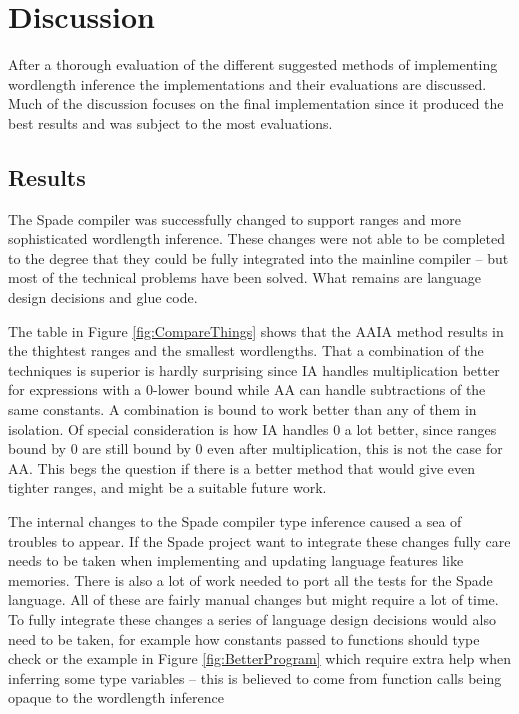 \chapter{Discussion}
\label{cha:Discussion}
After a thorough evaluation of the different suggested methods of implementing wordlength inference the implementations and their evaluations are discussed. Much of the discussion focuses on the final implementation since it produced the best results and was subject to the most evaluations.

\section{Results}
The Spade compiler was successfully changed to support ranges and more sophisticated wordlength inference. These changes were not able to be completed to the degree that they could be fully integrated into the mainline compiler -- but most of the technical problems have been solved. What remains are language design decisions and glue code.

The table in Figure \ref{fig:CompareThings} shows that the AAIA method results in the thightest ranges and the smallest wordlengths. That a combination of the techniques is superior is hardly surprising since IA handles multiplication better for expressions with a 0-lower bound while AA can handle subtractions of the same constants. A combination is bound to work better than any of them in isolation. Of special consideration is how IA handles $0$ a lot better, since ranges bound by 0 are still bound by $0$ even after multiplication, this is not the case for AA. This begs the question if there is a better method that would give even tighter ranges, and might be a suitable future work.

The internal changes to the Spade compiler type inference caused a sea of troubles to appear. If the Spade project want to integrate these changes fully care needs to be taken when implementing and updating language features like memories. There is also a lot of work needed to port all the tests for the Spade language. All of these are fairly manual changes but might require a lot of time. To fully integrate these changes a series of language design decisions would also need to be taken, for example how constants passed to functions should type check or the example in Figure \ref{fig:BetterProgram} which require extra help when inferring some type variables -- this is believed to come from function calls being opaque to the wordlength inference

